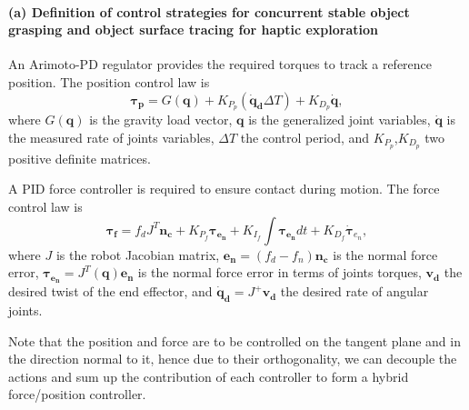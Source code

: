 
\paragraph{(a) Definition of control strategies for concurrent stable object grasping and object surface tracing for haptic exploration}

An Arimoto-PD regulator provides the required torques to track a reference position. The position control law is
\begin{equation}
    \bm{\tau_p} = G(\bm{q}) + K_{P_p} \left(\bm{\dot{q}_d}\Delta T\right) + K_{D_p}\bm{\dot{q}},
\end{equation}
where $G(\bm{q})$ is the gravity load vector, $\bm{{q}}$  is the generalized joint variables, $\bm{\dot{q}}$ is the measured rate of joints variables, $\Delta T$ the control period, and $K_{P_p}$,$K_{D_p}$ two positive definite matrices.


A PID force controller is required to ensure contact during motion. The force control law is
\begin{equation}
    \bm{\tau_f} = f_dJ^T\bm{n_c} + K_{P_f}\bm{\tau_{e_n}} + K_{I_f}\int\bm{\tau_{e_n}}dt + K_{D_f}\dot{\bm{\tau}}_{e_n},
\end{equation}
where $J$ is the robot Jacobian matrix, $\bm{e_n} = (f_d - f_n)\bm{n_c}$ is the normal force error, $\bm{\tau_{e_n}} = J^T(\bm{q})\bm{e_n}$ is the normal force error in terms of joints torques, $\bm{v_d}$ the desired twist of the end effector, and $\bm{\dot{q}_d} = J^+\bm{v_d}$ the desired rate of angular joints.

Note that the position and force are to be controlled on the tangent plane and in the direction normal to it, hence due to their orthogonality, we can decouple the actions and sum up the contribution of each controller to form a hybrid force/position controller.

